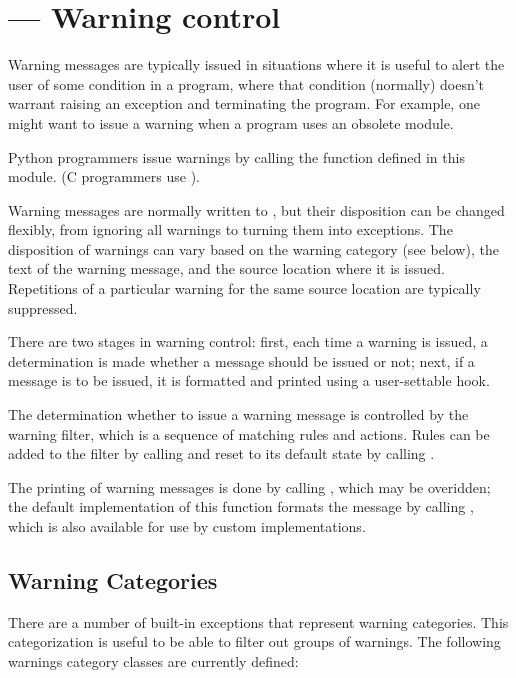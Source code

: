 \section{ ---
         Warning control}




Warning messages are typically issued in situations where it is useful
to alert the user of some condition in a program, where that condition
(normally) doesn't warrant raising an exception and terminating the
program.  For example, one might want to issue a warning when a
program uses an obsolete module.

Python programmers issue warnings by calling the 
function defined in this module.  (C programmers use
).

Warning messages are normally written to , but their
disposition can be changed flexibly, from ignoring all warnings to
turning them into exceptions.  The disposition of warnings can vary
based on the warning category (see below), the text of the warning
message, and the source location where it is issued.  Repetitions of a
particular warning for the same source location are typically
suppressed.

There are two stages in warning control: first, each time a warning is
issued, a determination is made whether a message should be issued or
not; next, if a message is to be issued, it is formatted and printed
using a user-settable hook.

The determination whether to issue a warning message is controlled by
the warning filter, which is a sequence of matching rules and actions.
Rules can be added to the filter by calling
 and reset to its default state by calling
.

The printing of warning messages is done by calling
, which may be overidden; the default
implementation of this function formats the message by calling
, which is also available for use by custom
implementations.


\subsection{Warning Categories}

There are a number of built-in exceptions that represent warning
categories.  This categorization is useful to be able to filter out
groups of warnings.  The following warnings category classes are
currently defined:

